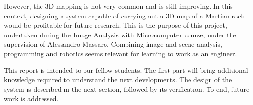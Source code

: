 However, the 3D mapping is not very common and is still improving. In this context, designing a system capable of carrying out a 3D map of a Martian rock would be profitable for future research. This is the purpose of this project, undertaken during the Image Analysis with Microcomputer course, under the supervision of Alessandro Massaro. Combining image and scene analysis, programming and robotics seems relevant for learning to work as an engineer.

This report is intended to our fellow students. The first part will bring additional knowledge required to understand the next developments. The design of the system is described in the next section, followed by its verification. To end, future work is addressed.